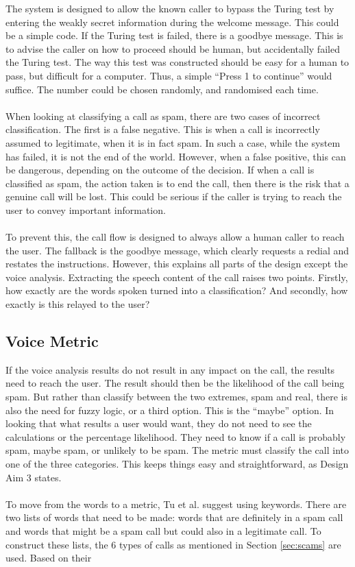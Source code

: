 \documentclass[main.tex]{subfiles}
\begin{document}
The system is designed to allow the known caller to bypass the Turing test by entering the weakly secret information during the welcome message. This could be a simple code. If the Turing test is failed, there is a goodbye message. This is to advise the caller on how to proceed should be human, but accidentally failed the Turing test. The way this test was constructed should be easy for a human to pass, but difficult for a computer. Thus, a simple ``Press 1 to continue'' would suffice. The number could be chosen randomly, and randomised each time.
\\\\
When looking at classifying a call as spam, there are two cases of incorrect classification. The first is a false negative. This is when a call is incorrectly assumed to legitimate, when it is in fact spam. In such a case, while the system has failed, it is not the end of the world. However, when a false positive, this can be dangerous, depending on the outcome of the decision. If when a call is classified as spam, the action taken is to end the call, then there is the risk that a genuine call will be lost. This could be serious if the caller is trying to reach the user to convey important information.
\\\\
To prevent this, the call flow is designed to always allow a human caller to reach the user. The fallback is the goodbye message, which clearly requests a redial and restates the instructions. However, this explains all parts of the design except the voice analysis. Extracting the speech content of the call raises two points. Firstly, how exactly are the words spoken turned into a classification? And secondly, how exactly is this relayed to the user?

\subsection{Voice Metric}
If the voice analysis results do not result in any impact on the call, the results need to reach the user. The result should then be the likelihood of the call being spam. But rather than classify between the two extremes, spam and real, there is also the need for fuzzy logic, or a third option. This is the ``maybe'' option. In looking that what results a user would want, they do not need to see the calculations or the percentage likelihood. They need to know if a call is probably spam, maybe spam, or unlikely to be spam. The metric must classify the call into one of the three categories. This keeps things easy and straightforward, as Design Aim 3 states.
\\\\
To move from the words to a metric, Tu et al. \cite{cisco} suggest using keywords. There are two lists of words that need to be made: words that are definitely in a spam call and words that might be a spam call but could also in a legitimate call. To construct these lists, the 6 types of calls as mentioned in Section \ref{sec:scams} are used. Based on their 
\end{document}
